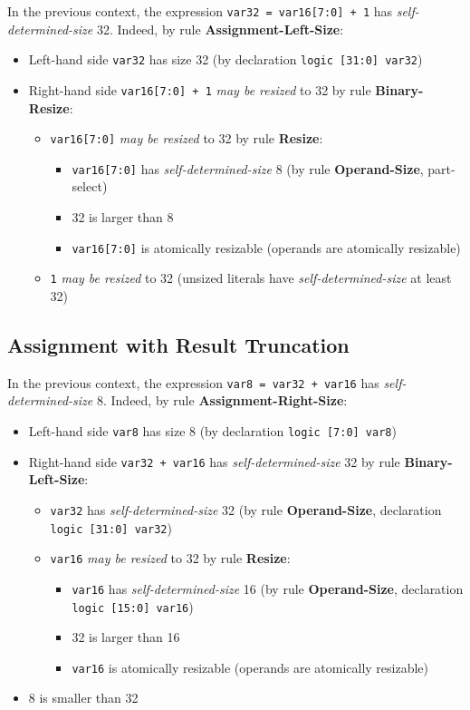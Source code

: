 \documentclass{article}
\newcommand{\sv}[1]{\texttt{#1}}
\newcommand{\sds}{\emph{self-determined-size}}
\newcommand{\mbr}{\emph{may be resized}}
\begin{document}
In the previous context, the expression \sv{var32 = var16[7:0] + 1} has
\sds{} 32. Indeed, by rule \textbf{Assignment-Left-Size}:

\begin{itemize}
  \item Left-hand side \sv{var32} has size 32 (by declaration
    \sv{logic [31:0] var32})
  \item Right-hand side \sv{var16[7:0] + 1} \mbr{} to 32 by
    rule \textbf{Binary-Resize}:
    \begin{itemize}
      \item \sv{var16[7:0]} \mbr{} to 32 by rule
        \textbf{Resize}:
        \begin{itemize}
          \item \sv{var16[7:0]} has \sds{} 8
            (by rule \textbf{Operand-Size}, part-select)
          \item 32 is larger than 8
          \item \sv{var16[7:0]} is atomically resizable
            (operands are atomically resizable)
        \end{itemize}
      \item \sv{1} \mbr{} to 32 (unsized literals have
        \sds{} at least 32)
    \end{itemize}
\end{itemize}

\subsection{Assignment with Result Truncation}

In the previous context, the expression \sv{var8 = var32 + var16} has
\sds{} 8. Indeed, by rule \textbf{Assignment-Right-Size}:

\begin{itemize}
  \item Left-hand side \sv{var8} has size 8 (by declaration
    \sv{logic [7:0] var8})
  \item Right-hand side \sv{var32 + var16} has \sds{}
    32 by rule \textbf{Binary-Left-Size}:
    \begin{itemize}
      \item \sv{var32} has \sds{} 32 (by rule
        \textbf{Operand-Size}, declaration \sv{logic [31:0] var32})
      \item \sv{var16} \mbr{} to 32 by rule
        \textbf{Resize}:
        \begin{itemize}
          \item \sv{var16} has \sds{} 16 (by rule
            \textbf{Operand-Size}, declaration \sv{logic [15:0] var16})
          \item 32 is larger than 16
          \item \sv{var16} is atomically resizable (operands are atomically
            resizable)
        \end{itemize}
    \end{itemize}
  \item 8 is smaller than 32
\end{itemize}
\end{document}
